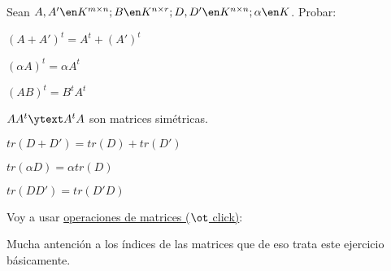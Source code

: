 \begin{enunciado}{\ejercicio}
  Sean $A, A' \en K^{m \times n}; B \en K^{n \times r}; D, D' \en K^{n \times n}; \alpha \en K$. Probar:
  \begin{enumerate}[label=(\alph*)]
    \begin{multicols}{2}
      \item $(A + A')^t = A^t + (A')^t$
      \item $(\alpha A)^t = \alpha A^t$
      \item $(AB)^t = B^tA^t$
      \item $AA^t \ytext A^tA$ son matrices simétricas.
      \item $tr(D + D') = tr(D) + tr(D')$
      \item $tr(\alpha D) = \alpha tr(D)$
      \item $tr(D D') = tr(D'D)$
    \end{multicols}
  \end{enumerate}
\end{enunciado}

Voy a usar \hyperlink{teoria-1:operaciones-matrices}{operaciones de matrices {\tiny($\ot$ click)}}:

\red{\atencion}Mucha antención a los índices de las matrices que de eso trata este ejercicio básicamente.

